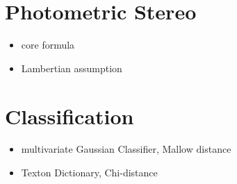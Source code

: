 \hypertarget{Approach}{
\section{Photometric Stereo}\label{PhotometricStereo}
}

\begin{itemize}
	\item{core formula}
	\item{Lambertian assumption}
\end{itemize}


\section{Classification}
\begin{itemize}
	\item{multivariate Gaussian Classifier, Mallow distance}
	\item{Texton Dictionary, Chi-distance}
\end{itemize}

